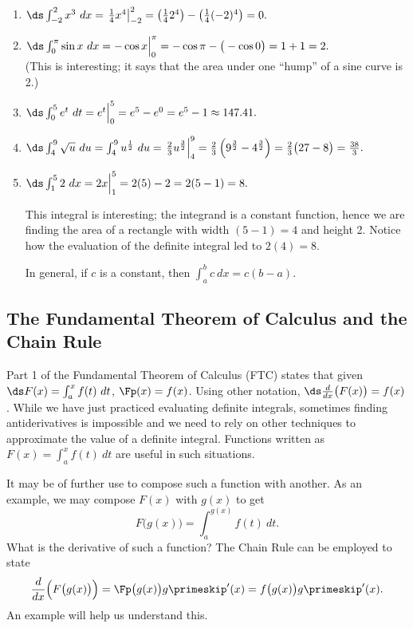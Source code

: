{\begin{enumerate}
\item	$\ds \int_{-2}^2 x^3\ dx = \left.\frac14x^4\right|_{-2}^2 = \left(\frac142^4\right) - \left(\frac14(-2)^4\right) = 0.$
\item	$\ds \int_0^\pi \sin x\ dx = -\cos x\Big|_0^\pi = -\cos \pi- \big(-\cos 0\big) = 1+1=2.$ \\
(This is interesting; it says that the area under one ``hump'' of a sine curve is 2.)
\item	$\ds \int_0^5e^t\ dt = e^t\Big|_0^5 = e^5 - e^0 = e^5-1 \approx 147.41.$
\item	$\ds \int_4^9 \sqrt{u}\ du = \int_4^9 u^\frac12\ du = \left.\frac23u^\frac32\right|_4^9 = \frac23\left(9^\frac32-4^\frac32\right) = \frac23\big(27-8\big) =\frac{38}3.$
\item	$\ds \int_1^5 2\ dx = 2x\Big|_1^5 = 2(5)-2=2(5-1)=8.$ 

This integral is interesting; the integrand is a constant function, hence we are finding the area of a rectangle with width $(5-1)=4$ and height 2. Notice how the evaluation of the definite integral led to $2(4)=8$. 

In general, if $c$ is a constant, then $\int_a^b c\ dx = c(b-a)$.\eoehere
\end{enumerate}}

\subsection{The Fundamental Theorem of Calculus and the Chain Rule}

Part 1 of the Fundamental Theorem of Calculus (FTC) states that given $\ds F(x) = \int_a^x f(t)\ dt$,  $\Fp(x) = f(x)$. Using other notation, $\ds \frac{d}{dx}\big(F(x)\big) = f(x)$. While we have just practiced evaluating definite integrals, sometimes finding antiderivatives is impossible and we need to rely on other techniques to approximate the value of a definite integral. Functions written as $F(x) = \int_a^x f(t)\ dt$ are useful in such situations.

It may be of further use to compose such a function with another. As an example, we may compose $F(x)$ with $g(x)$ to get
\[F\big(g(x)\big) = \int_a^{g(x)} f(t)\ dt.\]
What is the derivative of such a function? The Chain Rule can be employed to state
\[
\frac{d}{dx}\Big(F\big(g(x)\big)\Big) = \Fp\big(g(x)\big)g\primeskip'(x)
= f\big(g(x)\big)g\primeskip'(x).
\]
An example will help us understand this.

